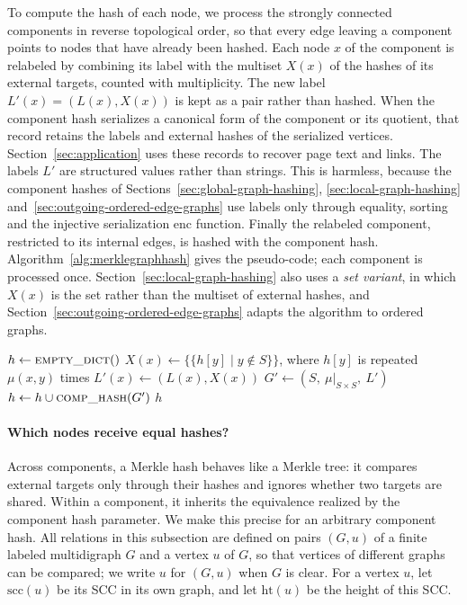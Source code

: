 \documentclass[twoside,leqno]{article}
\newcommand{\HM}{\mathcal{H}_{M}}
\newcommand{\hgt}{\mathrm{ht}}
\newcommand{\Scc}{\mathrm{scc}}
\newcommand{\enc}{\mathrm{enc}}
\newcommand{\mset}[1]{\{\!\!\{#1\}\!\!\}}
\begin{document}
To compute the hash of each node, we process the strongly connected components in reverse topological order, so that every edge leaving a component points to nodes that have already been hashed. Each node $x$ of the component is relabeled by combining its label with the multiset $X(x)$ of the hashes of its external targets, counted with multiplicity. The new label $L'(x)=(L(x),X(x))$ is kept as a pair rather than hashed. When the component hash serializes a canonical form of the component or its quotient, that record retains the labels and external hashes of the serialized vertices. Section~\ref{sec:application} uses these records to recover page text and links. The labels $L'$ are structured values rather than strings. This is harmless, because the component hashes of Sections~\ref{sec:global-graph-hashing}, \ref{sec:local-graph-hashing} and~\ref{sec:outgoing-ordered-edge-graphs} use labels only through equality, sorting and the injective serialization $\enc$ function. Finally the relabeled component, restricted to its internal edges, is hashed with the component hash. Algorithm~\ref{alg:merklegraphhash} gives the pseudo-code; each component is processed once. Section~\ref{sec:local-graph-hashing} also uses a \emph{set variant}, in which $X(x)$ is the set rather than the multiset of external hashes, and Section~\ref{sec:outgoing-ordered-edge-graphs} adapts the algorithm to ordered graphs.

\begin{algorithm}
    \caption{Merkle Graph Node Hashing}\label{alg:merklegraphhash}
    \begin{algorithmic}[1]
    \Function{$\HM$}{$G=(V,\mu,L)$, \textproc{comp\_hash}}
        \State $h \gets \textproc{empty\_dict}()$
         
            \State $X(x) \gets \mset{h[y] \mid y\notin S}$, where $h[y]$ is repeated $\mu(x,y)$ times \label{line:merkle-X}
            \State $L'(x) \gets (L(x), X(x))$ 
          \EndFor
          \State $G' \gets (S,\ \mu|_{S\times S},\ L')$ \label{line:merkle-G}
          \State $h \gets h \cup \textproc{comp\_hash}(G')$ 
        \EndFor
        \State \Return $h$
    \EndFunction
    \end{algorithmic}
\end{algorithm}

\paragraph{Which nodes receive equal hashes?}
Across components, a Merkle hash behaves like a Merkle tree: it compares external targets only through their hashes and ignores whether two targets are shared. Within a component, it inherits the equivalence realized by the component hash parameter. We make this precise for an arbitrary component hash. All relations in this subsection are defined on pairs $(G,u)$ of a finite labeled multidigraph $G$ and a vertex $u$ of $G$, so that vertices of different graphs can be compared; we write $u$ for $(G,u)$ when $G$ is clear. For a vertex $u$, let $\Scc(u)$ be its SCC in its own graph, and let $\hgt(u)$ be the height of this SCC.
\end{document}
